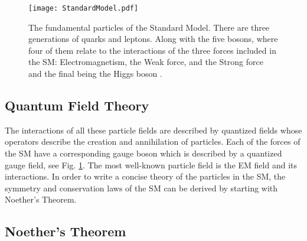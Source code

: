 \begin{figure}
 	\centering
	\texttt{[image: StandardModel.pdf]}
 	\caption[Standard Model particles]{The fundamental particles of the Standard Model. There are three generations of quarks and leptons. Along with the five bosons, where four of them relate to the interactions of the three forces included in the SM: Electromagnetism, the Weak force, and the Strong force and the final being the Higgs boson \cite{noauthor_https://www.quantumdiaries.org/2014/03/14/-standard-model--beautiful-but-flawed-theory/_nodate}.}
 	\label{SMParticles} 
\end{figure}
 
 \subsection{Quantum Field Theory}
 \label{QFT}
 
 The interactions of all these particle fields are described by quantized fields whose operators describe the creation and annihilation of particles. Each of the forces of the SM have a corresponding gauge boson which is described by a quantized gauge field, see Fig. \ref{SMParticles}. The most well-known particle field is the EM field and its interactions. In order to write a concise theory of the particles in the SM, the symmetry and conservation laws of the SM can be derived by starting with Noether's Theorem.
 
 \subsection{Noether's Theorem}
 
